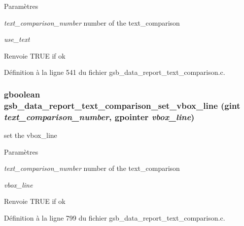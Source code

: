 \begin{DoxyParams}{Paramètres}
\item[{\em text\_\-comparison\_\-number}]number of the text\_\-comparison \item[{\em use\_\-text}]\end{DoxyParams}
\begin{DoxyReturn}{Renvoie}
TRUE if ok 
\end{DoxyReturn}


Définition à la ligne 541 du fichier gsb\_\-data\_\-report\_\-text\_\-comparison.c.

\subsubsection[{gsb\_\-data\_\-report\_\-text\_\-comparison\_\-set\_\-vbox\_\-line}]{\setlength{\rightskip}{0pt plus 5cm}gboolean gsb\_\-data\_\-report\_\-text\_\-comparison\_\-set\_\-vbox\_\-line (gint {\em text\_\-comparison\_\-number}, \/  gpointer {\em vbox\_\-line})}\label{gsb__data__report__text__comparison_8c_a748d2dc15458afe5a479bdc81082ecab}
set the vbox\_\-line


\begin{DoxyParams}{Paramètres}
\item[{\em text\_\-comparison\_\-number}]number of the text\_\-comparison \item[{\em vbox\_\-line}]\end{DoxyParams}
\begin{DoxyReturn}{Renvoie}
TRUE if ok 
\end{DoxyReturn}


Définition à la ligne 799 du fichier gsb\_\-data\_\-report\_\-text\_\-comparison.c.

